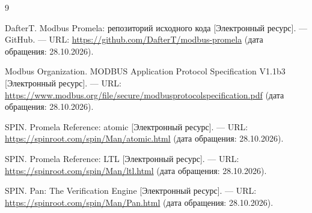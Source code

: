 \renewcommand{\refname}{Список использованных источников}
\begin{thebibliography}{9}

DafterT. Modbus Promela: репозиторий исходного кода
[Электронный ресурс]. --- GitHub. --- URL:
\url{https://github.com/DafterT/modbus-promela}
(дата обращения: 28.10.2026).

Modbus Organization. MODBUS Application Protocol Specification V1.1b3
[Электронный ресурс]. --- URL:
\url{https://www.modbus.org/file/secure/modbusprotocolspecification.pdf}
(дата обращения: 28.10.2026).

SPIN. Promela Reference: atomic
[Электронный ресурс]. --- URL:
\url{https://spinroot.com/spin/Man/atomic.html}
(дата обращения: 28.10.2026).

SPIN. Promela Reference: LTL
[Электронный ресурс]. --- URL:
\url{https://spinroot.com/spin/Man/ltl.html}
(дата обращения: 28.10.2026).

SPIN. Pan: The Verification Engine
[Электронный ресурс]. --- URL:
\url{https://spinroot.com/spin/Man/Pan.html}
(дата обращения: 28.10.2026).

\end{thebibliography}
